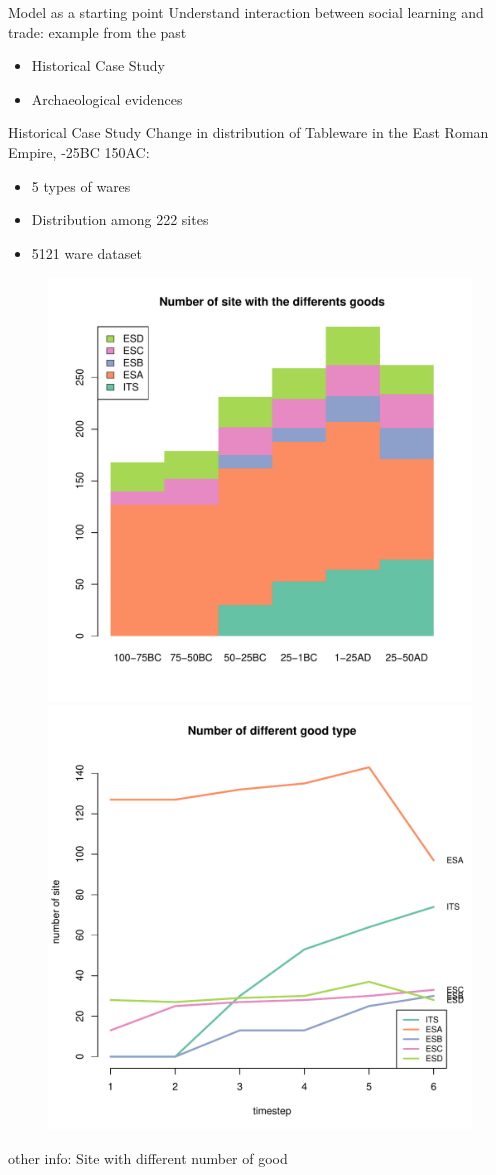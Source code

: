 \documentclass[12pt, notes=show]{beamer}
\begin{document}
\begin{frame}{Model as a starting point}
 Understand interaction between social learning and trade: example from the past
 \vfil
 \begin{itemize}
     \item Historical Case Study
 \vfil
     \item Archaeological evidences
 \end{itemize}

    
\end{frame}



\begin{frame}{Historical Case Study}
    \footnotesize
    \vspace{.5cm}
Change in distribution of Tableware in the East Roman Empire, -25BC 150AC:
    \begin{itemize}
	\item 5 types of wares 
	\item Distribution among 222 sites
	\item 5121 ware dataset
 \end{itemize}

 \begin{figure}
     \includegraphics[width=.45\textwidth]{../images/hmNbSiteWGoodData.pdf}
     \includegraphics[width=.45\textwidth]{../images/plotNbSiteWGoodData.pdf}
     
 \end{figure}
 \begin{center}
     \tiny other info: Site with different number of good
 \end{center}
\end{frame}
\end{document}
